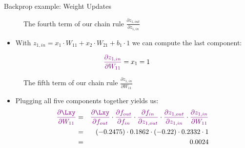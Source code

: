 \begin{vbframe}{Backprop example: Weight Updates}
\begin{figure}
      \caption{The fourth term of our chain rule $\frac{\partial z_{1,out}}{\partial z_{1,in}}$}
  \end{figure}
\framebreak
  \begin{itemize}
    \item With $z_{1,in} = x_1 \cdot W_{11} + x_2 \cdot W_{21} + b_1 \cdot 1$ we can compute the last component:
  \end{itemize}
  \begin{eqnarray*}
    \textcolor{violet}{\frac{\partial z_{1,in}}{\partial W_{11}}} = x_1 = 1
  \end{eqnarray*}
  \begin{figure}
    \centering
      \caption{The fifth term of our chain rule $\frac{\partial z_{1,in}}{\partial W_{11}}$}
  \end{figure}
\framebreak
  \begin{itemize}
    \item Plugging all five components together yields us: 
      \begin{eqnarray*}
         \textcolor{violet}{\frac{\partial \Lxy}{\partial W_{11}}} &=& 
         \textcolor{violet}{\frac{\partial \Lxy}{\partial f_{out}}} \cdot  \textcolor{violet}{\frac{\partial f_{out}}{\partial f_{in}}} \cdot  \textcolor{violet}{\frac{\partial f_{in}}{\partial z_{1,out}}} \cdot  \textcolor{violet}{\frac{\partial z_{1,out}}{\partial z_{1,in}}} \cdot  \textcolor{violet}{\frac{\partial z_{1,in}}{\partial W_{11}}} 
        \\ &=& (\num[round-mode=places,round-precision=4]{-0.2474531}) \cdot \num[round-mode=places,round-precision=4]{0.1862201} \cdot (-0.22) \cdot \num[round-mode=places,round-precision=4]{0.2332341} \cdot 1 
        \\ &=& \num[round-mode=places,round-precision=4]{0.0023645}
      \end{eqnarray*}

\end{itemize}
\end{vbframe}
